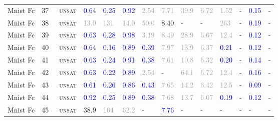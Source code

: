 \begin{center}
{\begin{longtable}{@{}llllllllllllll@{}}
Mnist Fc & 37 & ~\textsc{unsat} & \textcolor{blue}{0.64} & \textcolor{blue}{0.25} & \textcolor{blue}{0.92} & \textcolor{darkgray}{2.54} & \textcolor{darkgray}{7.71} & \textcolor{darkgray}{39.9} & \textcolor{darkgray}{6.72} & \textcolor{darkgray}{1.52} & - & \textcolor{blue}{0.15} & - \\
Mnist Fc & 38 & ~\textsc{unsat} & \textcolor{darkgray}{13.0} & \textcolor{darkgray}{131} & \textcolor{darkgray}{14.0} & \textcolor{darkgray}{50.0} & \textcolor{second}{8.40} & - & - & \textcolor{darkgray}{263} & - & \textcolor{blue}{0.19} & - \\
Mnist Fc & 39 & ~\textsc{unsat} & \textcolor{blue}{0.63} & \textcolor{blue}{0.28} & \textcolor{blue}{0.98} & \textcolor{darkgray}{3.19} & \textcolor{darkgray}{8.49} & \textcolor{darkgray}{28.9} & \textcolor{darkgray}{6.67} & \textcolor{darkgray}{12.4} & - & \textcolor{blue}{0.12} & - \\
Mnist Fc & 40 & ~\textsc{unsat} & \textcolor{blue}{0.64} & \textcolor{blue}{0.16} & \textcolor{blue}{0.89} & \textcolor{blue}{0.39} & \textcolor{darkgray}{7.97} & \textcolor{darkgray}{13.9} & \textcolor{darkgray}{6.37} & \textcolor{blue}{0.21} & - & \textcolor{blue}{0.12} & - \\
Mnist Fc & 41 & ~\textsc{unsat} & \textcolor{blue}{0.63} & \textcolor{blue}{0.24} & \textcolor{blue}{0.91} & \textcolor{blue}{0.38} & \textcolor{darkgray}{7.61} & \textcolor{darkgray}{10.8} & \textcolor{darkgray}{6.32} & \textcolor{blue}{0.20} & - & \textcolor{blue}{0.14} & - \\
Mnist Fc & 42 & ~\textsc{unsat} & \textcolor{blue}{0.63} & \textcolor{blue}{0.22} & \textcolor{blue}{0.89} & \textcolor{darkgray}{2.54} & - & \textcolor{darkgray}{64.1} & \textcolor{darkgray}{6.72} & \textcolor{darkgray}{12.4} & - & \textcolor{blue}{0.16} & - \\
Mnist Fc & 43 & ~\textsc{unsat} & \textcolor{blue}{0.61} & \textcolor{blue}{0.26} & \textcolor{blue}{0.86} & \textcolor{blue}{0.43} & \textcolor{darkgray}{7.65} & \textcolor{darkgray}{14.2} & \textcolor{darkgray}{6.42} & \textcolor{darkgray}{12.5} & - & \textcolor{blue}{0.09} & - \\
Mnist Fc & 44 & ~\textsc{unsat} & \textcolor{blue}{0.92} & \textcolor{blue}{0.25} & \textcolor{blue}{0.89} & \textcolor{blue}{0.38} & \textcolor{darkgray}{7.68} & \textcolor{darkgray}{13.7} & \textcolor{darkgray}{6.07} & \textcolor{blue}{0.19} & - & \textcolor{blue}{0.12} & - \\
Mnist Fc & 45 & ~\textsc{unsat} & \textcolor{second}{38.9} & \textcolor{darkgray}{164} & \textcolor{darkgray}{62.2} & - & \textcolor{blue}{7.76} & - & - & - & - & - & - \\

\end{longtable}}
\end{center}
